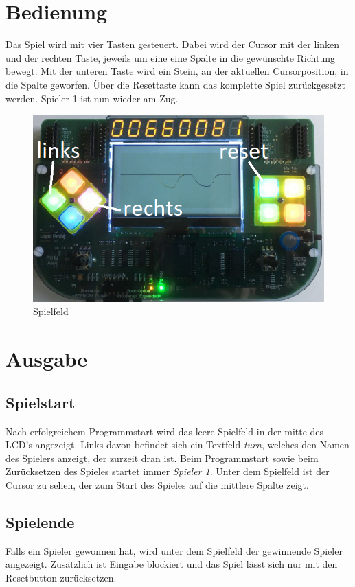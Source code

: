 \section{Bedienung}
    Das Spiel wird mit vier Tasten gesteuert.
    Dabei wird der Cursor mit der linken und der rechten Taste, jeweils um eine eine Spalte in die gewünschte Richtung bewegt.
    Mit der unteren Taste wird ein Stein, an der aktuellen Cursorposition, in die Spalte geworfen.
    Über die Resettaste kann das komplette Spiel zurückgesetzt werden. Spieler 1 ist nun wieder am Zug.
    \begin{figure}[H]
        \centering
        \label{spielfeld}
        \includegraphics[scale=0.5]{img/board.png}    
        \caption{Spielfeld}
    \end{figure}

\section{Ausgabe}
    \subsection{Spielstart}
        Nach erfolgreichem Programmstart wird das leere Spielfeld in der mitte des LCD's angezeigt.
        Links davon befindet sich ein Textfeld \textit{turn}, welches den Namen des Spielers anzeigt, der zurzeit dran ist.
        Beim Programmstart sowie beim Zurücksetzen des Spieles startet immer \textit{Spieler 1}.
        Unter dem Spielfeld ist der Cursor zu sehen, der zum Start des Spieles auf die mittlere Spalte zeigt.
    \subsection{Spielende}
        Falls ein Spieler gewonnen hat, wird unter dem Spielfeld der gewinnende Spieler angezeigt.
        Zusätzlich ist Eingabe blockiert und das Spiel lässt sich nur mit den Resetbutton zurücksetzen.




